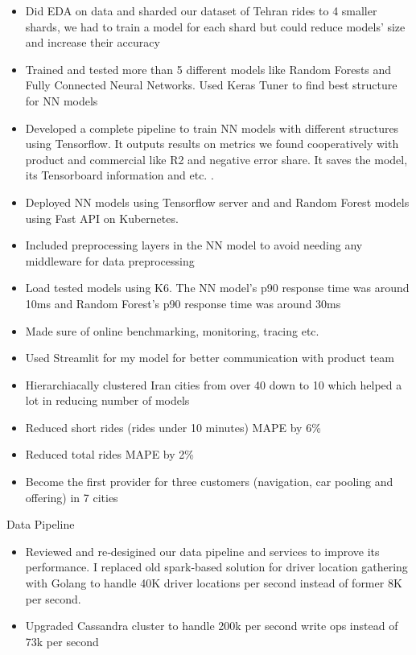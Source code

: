 \begin{cventries}
{\begin{cvitems}
\begin{itemize}
          \item Did EDA on data and sharded our dataset of Tehran rides to 4 smaller shards, we had to train a model for each shard but could reduce models' size and increase their accuracy
          \item Trained and tested more than 5 different models like Random Forests and Fully Connected Neural Networks. Used Keras Tuner to find best structure for NN models
          \item Developed a complete pipeline to train NN models with different structures using Tensorflow. It outputs results on metrics we found cooperatively with product and commercial like R2 and negative error share. It saves the model, its Tensorboard information and etc. .
          \item Deployed NN models using Tensorflow server and and Random Forest models using Fast API on Kubernetes. 
          \item Included preprocessing layers in the NN model to avoid needing any middleware for data preprocessing
          \item Load tested models using K6. The NN model's p90 response time was around 10ms and Random Forest's p90 response time was around 30ms
          \item Made sure of online benchmarking, monitoring, tracing etc.
          \item Used Streamlit for my model for better communication with product team
          \item Hierarchiacally clustered Iran cities from over 40 down to 10 which helped a lot in reducing number of models
          \item Reduced short rides (rides under 10 minutes) MAPE by 6\%
          \item Reduced total rides MAPE by 2\%
          \item Become the first provider for three customers (navigation, car pooling and offering) in 7 cities
        \end{itemize}
        \item Data Pipeline
        \begin{itemize}
          \item Reviewed and re‐desigined our data pipeline and services to improve its performance. I replaced old spark‐based solution for driver location gathering with Golang to handle 40K driver locations per second instead of former 8K per second.
          \item Upgraded Cassandra cluster to handle 200k per second write ops instead of 73k per second

\end{itemize}
\end{cvitems}}
\end{cventries}
